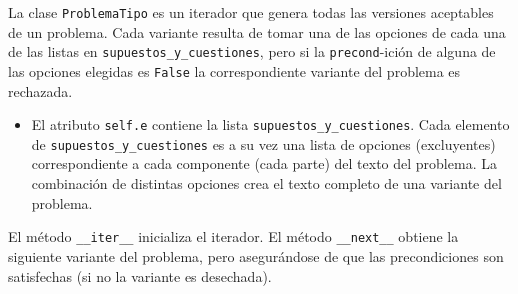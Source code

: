 \documentclass[10pt,a4paper]{report}
\begin{document}
La clase \texttt{ProblemaTipo} es un iterador que genera todas las versiones aceptables de un problema.
Cada variante resulta de tomar una de las opciones de cada una de las listas en \texttt{supuestos\_y\_cuestiones}, pero si la \texttt{precond}-ición de alguna de las opciones elegidas es \texttt{False} la correspondiente variante del problema es rechazada.
\begin{itemize}
\item El atributo \texttt{self.e} contiene la lista \texttt{supuestos\_y\_cuestiones}.
 Cada elemento de \texttt{supuestos\_y\_cuestiones} es a su vez una lista de opciones (excluyentes) correspondiente a cada componente (cada parte) del texto del problema.
La combinación de distintas opciones crea el texto completo de una variante del problema.
\end{itemize}
El método \texttt{\_\_iter\_\_} inicializa el iterador.
El método \texttt{\_\_next\_\_} obtiene la siguiente variante del problema, pero asegurándose de que las precondiciones son satisfechas (si no la variante es desechada).
\end{document}
